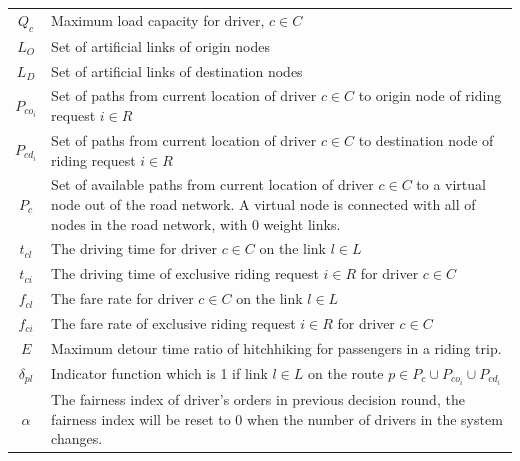 \begin{longtable}{cp{14cm}}
    $Q_c$ & Maximum load capacity for driver, $c \in C$ \\
    $L_{O}$ & Set of artificial links of origin nodes \\
    $L_{D}$ & Set of artificial links of destination nodes \\
    $P_{co_i}$ & Set of paths from current location of driver $c \in C$ to origin node of riding request $i \in R$ \\
    $P_{cd_i}$ & Set of paths from current location of driver $c \in C$ to destination node of riding request $i \in R$ \\
    $P_c$ & Set of available paths from current location of driver $c \in C$ to a virtual node out of the road network. A virtual node is connected with all of nodes in the road network, with 0 weight links. \\
    $t_{cl}$ & The driving time for driver $c \in C$ on the link $l \in L$ \\
    $t_{ci}$ & The driving time of exclusive riding request $i \in R$ for driver $c \in C$ \\
    $f_{cl}$ & The fare rate for driver $c \in C$ on the link $l \in L$ \\
    $f_{ci}$ & The fare rate of exclusive riding request $i \in R$ for driver $c \in C$ \\
    $E$ & Maximum detour time ratio of hitchhiking for passengers in a riding trip. \\
    $\delta_{pl}$ & Indicator function which is 1 if link $l \in L$ on the route $p \in P_c \cup P_{co_i} \cup P_{cd_i}$ \\
    $\alpha$ & The fairness index of driver's orders in previous decision round, the fairness index will be reset to 0 when the number of drivers in the system changes. \\
  \bottomrule
\end{longtable}  
\par

